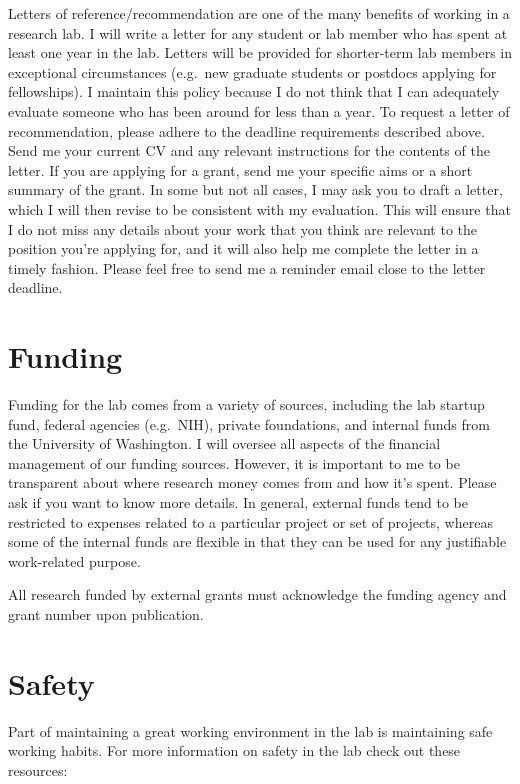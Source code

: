 \documentclass[
]{book}
\begin{document}
Letters of reference/recommendation are one of the many benefits of working in a research lab. I will write a letter for any student or lab member who has spent at least one year in the lab. Letters will be provided for shorter-term lab members in exceptional circumstances (e.g.~new graduate students or postdocs applying for fellowships). I maintain this policy because I do not think that I can adequately evaluate someone who has been around for less than a year.
To request a letter of recommendation, please adhere to the deadline requirements described above. Send me your current CV and any relevant instructions for the contents of the letter. If you are applying for a grant, send me your specific aims or a short summary of the grant. In some but not all cases, I may ask you to draft a letter, which I will then revise to be consistent with my evaluation. This will ensure that I do not miss any details about your work that you think are relevant to the position you're applying for, and it will also help me complete the letter in a timely fashion. Please feel free to send me a reminder email close to the letter deadline.

\hypertarget{funding}{%
\section{Funding}\label{funding}}

Funding for the lab comes from a variety of sources, including the lab startup fund, federal agencies (e.g.~NIH), private foundations, and internal funds from the University of Washington. I will oversee all aspects of the financial management of our funding sources. However, it is important to me to be transparent about where research money comes from and how it's spent. Please ask if you want to know more details. In general, external funds tend to be restricted to expenses related to a particular project or set of projects, whereas some of the internal funds are flexible in that they can be used for any justifiable work-related purpose.

All research funded by external grants must acknowledge the funding agency and grant number upon publication.

\hypertarget{safety}{%
\section{Safety}\label{safety}}

Part of maintaining a great working environment in the lab is maintaining safe working habits. For more information on safety in the lab check out these resources:
\end{document}
